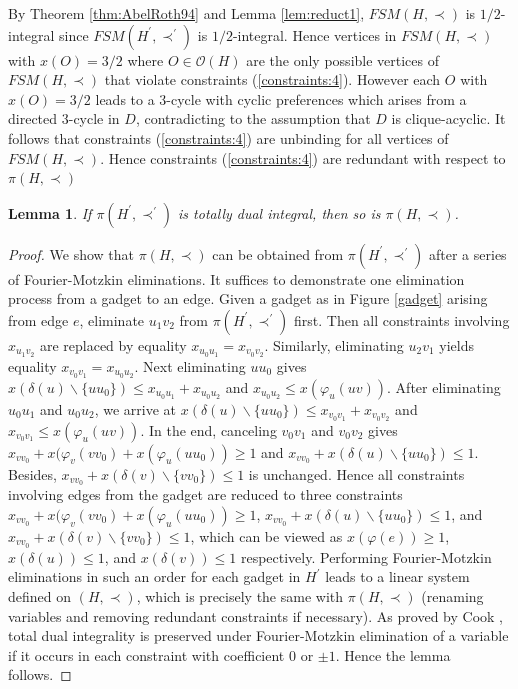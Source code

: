 \documentclass[11pt]{article}
\newtheorem{lemma}[theorem]{Lemma}
\numberwithin{theorem}{section}
\begin{document}
By Theorem \ref{thm:AbelRoth94} and Lemma \ref{lem:reduct1}, $FSM(H,\prec)$ is $1/2$-integral since $FSM(H^\prime,\prec^\prime)$ is $1/2$-integral.
Hence vertices in $FSM(H,\prec)$ with $x(O)=3/2$ where $O\in \mathcal{O}(H)$ are the only possible vertices of $FSM(H,\prec)$ that violate constraints (\ref{constraints:4}).
However each $O$ with $x(O)=3/2$ leads to a $3$-cycle with cyclic preferences which arises from a directed $3$-cycle in $D$, contradicting to the assumption that $D$ is clique-acyclic.
It follows that constraints (\ref{constraints:4}) are unbinding for all vertices of $FSM(H,\prec)$.
Hence constraints (\ref{constraints:4}) are redundant with respect to $\pi(H,\prec)$

\begin{lemma}
\label{lem:reduct2}
  If $\pi(H^\prime,\prec^\prime)$ is  totally dual integral, then so is $\pi(H,\prec)$.
\end{lemma}
\begin{proof}
  We show that $\pi(H,\prec)$ can be obtained from $\pi(H^\prime,\prec^\prime)$ after a series of Fourier-Motzkin eliminations.
  It suffices to demonstrate one elimination process from a gadget to an edge.
  Given a gadget as in Figure \ref{gadget} arising from edge $e$, eliminate $u_1 v_2$ from $\pi(H^\prime,\prec^\prime)$ first.
  Then all constraints involving $x_{u_1 v_2}$ are replaced by equality $x_{u_0 u_1}=x_{v_0 v_2}$.
  Similarly, eliminating $u_2 v_1$ yields equality $x_{v_0 v_1}=x_{u_0 u_2}$.
  Next eliminating $u u_0$ gives $x(\delta (u)\backslash\{u u_0\})\leq x_{u_0 u_1}+x_{u_0 u_2}$ and $x_{u_0 u_2}\leq x(\varphi_u(uv))$.
  After eliminating $u_0 u_1$ and $u_0 u_2$, we arrive at $x(\delta(u)\backslash\{u u_0\})\leq x_{v_0 v_1}+x_{v_0 v_2}$ and $x_{v_0 v_1}\leq x(\varphi_u(uv))$.
  In the end, canceling $v_0 v_1$ and $v_0 v_2$ gives $x_{v v_0}+x(\varphi_v(v v_0)+x(\varphi_u(u u_0))\geq 1$ and $x_{v v_0}+x(\delta(u)\backslash\{u u_0\})\leq 1$.
  Besides, $x_{v v_0}+x(\delta(v)\backslash\{v v_0\})\leq 1$ is unchanged.
  Hence all constraints involving edges from the gadget are reduced to three constraints
  $x_{v v_0}+x(\varphi_v(v v_0)+x(\varphi_u(u u_0))\geq 1$,
  $x_{v v_0}+x(\delta (u)\backslash\{u u_0\})\leq 1$,
  and $x_{v v_0}+x(\delta(v)\backslash\{v v_0\})\leq 1$,
  which can be viewed as $x(\varphi(e))\geq 1$, $x(\delta(u))\leq 1$, and $x(\delta(v))\leq 1$ respectively.
  Performing Fourier-Motzkin eliminations in such an order for each gadget in $H^\prime$ leads to a linear system defined on $(H,\prec)$, which is precisely the same with $\pi(H,\prec)$ (renaming variables and removing redundant constraints if necessary).
  As proved by Cook \cite{Cook83}, total dual integrality is preserved under Fourier-Motzkin elimination of a variable if it occurs in each constraint with coefficient $0$ or $\pm 1$.
  Hence the lemma follows.
\end{proof}
\end{document}
